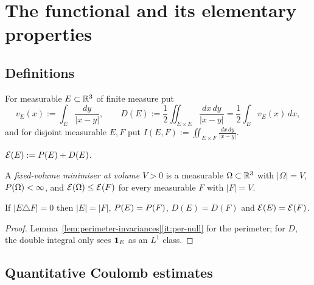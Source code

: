 \chapter{The functional and its elementary properties}\label{ch:functional}

\section{Definitions}

\begin{definition}\label{def:coulomb}
For measurable $E\subset\mathbb R^3$ of finite measure put
\[
  v_E(x):=\int_E\frac{dy}{|x-y|},
  \qquad
  D(E):=\frac12\iint_{E\times E}\frac{dx\,dy}{|x-y|}
       =\frac12\int_Ev_E(x)\,dx ,
\]
and for disjoint measurable $E,F$ put
$I(E,F):=\iint_{E\times F}\frac{dx\,dy}{|x-y|}$.
\end{definition}

\begin{definition}[Energy]\label{def:energy}
$\mathcal E(E):=P(E)+D(E)$.
\end{definition}

\begin{definition}\label{def:minimizer}
A \emph{fixed-volume minimiser at volume $V>0$} is a measurable
$\Omega\subset\mathbb R^3$ with $|\Omega|=V$, $P(\Omega)<\infty$, and
$\mathcal E(\Omega)\le\mathcal E(F)$ for every measurable $F$ with $|F|=V$.
\end{definition}

\begin{lemma}\label{lem:null-invariance}
If $|E\triangle F|=0$ then $|E|=|F|$, $P(E)=P(F)$, $D(E)=D(F)$ and
$\mathcal E(E)=\mathcal E(F)$.
\end{lemma}

\begin{proof}
Lemma~\ref{lem:perimeter-invariances}\ref{it:per-null} for the perimeter; for
$D$, the double integral only sees $\mathbf 1_{E}$ as an $L^1$ class.
\end{proof}

\section{Quantitative Coulomb estimates}

